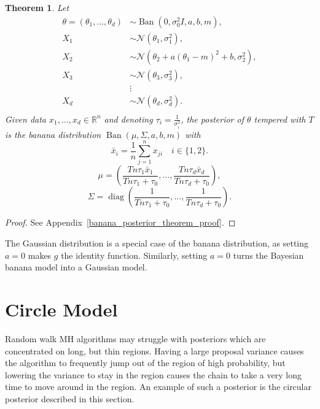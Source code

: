 \documentclass[english,twoside,openright]{HYgraduMLDS}
\newtheorem{theorem}{Theorem}
\newcommand{\R}{\mathbb{R}}
\newcommand{\caln}{{\mathcal{N}}}
\DeclareMathOperator{\ban}{Ban}
\DeclareMathOperator{\diag}{diag}
\begin{document}
\begin{theorem}\label{banana_posterior_theorem}
    Let
    \begin{align*}
        \theta = (\theta_1,\dotsc, \theta_d) &\sim
        \ban(0, \sigma_0^2I, a, b, m), \\
        X_1 &\sim \caln(\theta_1, \sigma_1^2), \\
        X_2 &\sim \caln(\theta_2 + a(\theta_1 - m)^2 + b, \sigma_2^2),\\
        X_3 &\sim \caln(\theta_3, \sigma_3^2), \\
            &\vdots \\
        X_d &\sim \caln(\theta_d, \sigma_d^2). \\
    \end{align*}
    Given data \(x_1,\dotsc, x_d\in \R^n\) and
    denoting \(\tau_i = \frac{1}{\sigma_i^2}\),
    the posterior of \(\theta\) tempered with \(T\) is the banana distribution
    \(\ban(\mu, \Sigma, a, b, m)\)
    with
    \[
        \bar{x}_i = \frac{1}{n}\sum_{j=1}^n x_{ji} \quad i\in \{1, 2\}.
    \]
    \[
        \mu = \left(\frac{Tn\tau_1\bar{x}_1}{Tn\tau_1 + \tau_0},\dotsc,
        \frac{Tn\tau_d\bar{x}_d}{Tn\tau_d + \tau_0}\right),
    \]
    \[
        \Sigma = \diag\left(
            \frac{1}{Tn\tau_1 + \tau_0},\dotsc,
            \frac{1}{Tn\tau_d + \tau_0}
        \right).
    \]
\end{theorem}
\begin{proof}
  See Appendix~\ref{banana_posterior_theorem_proof}.
\end{proof}
\setcounter{banana_posterior_theorem_number}{\value{theorem}}

The Gaussian distribution is a special case of the banana distribution,
as setting \(a = 0\) makes \(g\) the identity function. Similarly, setting
\(a = 0\) turns the Bayesian banana model into a Gaussian model.


\section{Circle Model}\label{circle_section}

Random walk MH algorithms may struggle with posteriors which are concentrated
on long, but thin regions. Having a large proposal variance causes the algorithm
to frequently jump out of the region of high probability, but lowering the
variance to stay in the region causes the chain to take a very long time to move
around in the region. An example of such a posterior is the circular posterior
described in this section.
\end{document}
